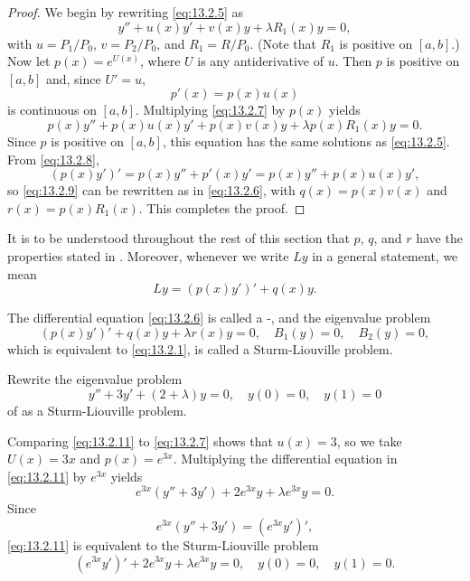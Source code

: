 \begin{proof}
We begin by rewriting \eqref{eq:13.2.5} as
\begin{equation} \label{eq:13.2.7}
y''+u(x)y'+v(x)y+\lambda R_{1}(x)y=0,
\end{equation}
with $u=P_{1}/P_{0}$, $v=P_{2}/P_{0}$, and $R_{1}=R/P_{0}$. (Note that
$R_{1}$ is positive on $[a,b]$.)  Now let $p(x)=e^{U(x)}$, where $U$ is any
antiderivative of $u$. Then $p$ is positive  on  $[a,b]$ and, since
$U'=u$,
\begin{equation} \label{eq:13.2.8}
p'(x)=p(x)u(x)
\end{equation}
is continuous on $[a,b]$. Multiplying \eqref{eq:13.2.7} by $p(x)$  yields
\begin{equation} \label{eq:13.2.9}
p(x)y''+p(x)u(x)y'+p(x)v(x)y+\lambda p(x)R_{1}(x)y=0.
\end{equation}
Since $p$ is positive on $[a,b]$, this equation has the same solutions as
\eqref{eq:13.2.5}. From \eqref{eq:13.2.8},
\[
(p(x)y')'=p(x)y''+p'(x)y'=p(x)y''+p(x)u(x)y',
\]
so \eqref{eq:13.2.9} can be rewritten as in \eqref{eq:13.2.6}, with $q(x)=p(x)v(x)$
and $r(x)=p(x)R_{1}(x)$. This completes the proof.
\end{proof}

It is to be understood throughout the rest of this section that $p$, $q$,
and $r$ have the properties stated in . Moreover,
whenever we write $Ly$ in a general statement, we mean
\[
Ly=(p(x)y')'+q(x)y.
\]

The differential equation \eqref{eq:13.2.6} is called a
-, and the
eigenvalue problem
\begin{equation} \label{eq:13.2.10}
(p(x)y')'+q(x)y+\lambda r(x)y=0,\quad B_{1}(y)=0,\quad
B_{2}(y)=0,
\end{equation}
which is equivalent to \eqref{eq:13.2.1}, is called a
Sturm-Liouville problem.

\begin{example}\label{example:13.2.3}
Rewrite the eigenvalue problem
\begin{equation} \label{eq:13.2.11}
y''+3y'+(2+\lambda)y=0,\quad y(0)=0,\quad y(1)=0
\end{equation}
of   as a Sturm-Liouville problem.
\end{example}

\begin{solution}
Comparing \eqref{eq:13.2.11} to \eqref{eq:13.2.7}  shows that $u(x)=3$, so we   take
$U(x)=3x$ and $p(x)=e^{3x}$. Multiplying the differential equation in
\eqref{eq:13.2.11} by $e^{3x}$ yields
\[
e^{3x}(y''+3y')+2e^{3x}y+\lambda e^{3x}y=0.
\]
Since
\[
e^{3x}(y''+3y')=(e^{3x}y')',
\]
 \eqref{eq:13.2.11} is equivalent to the Sturm-Liouville problem
\begin{equation} \label{eq:13.2.12}
(e^{3x}y')'+2e^{3x}y+\lambda e^{3x}y=0,\quad y(0)=0,\quad y(1)=0.
\end{equation}
\end{solution}

